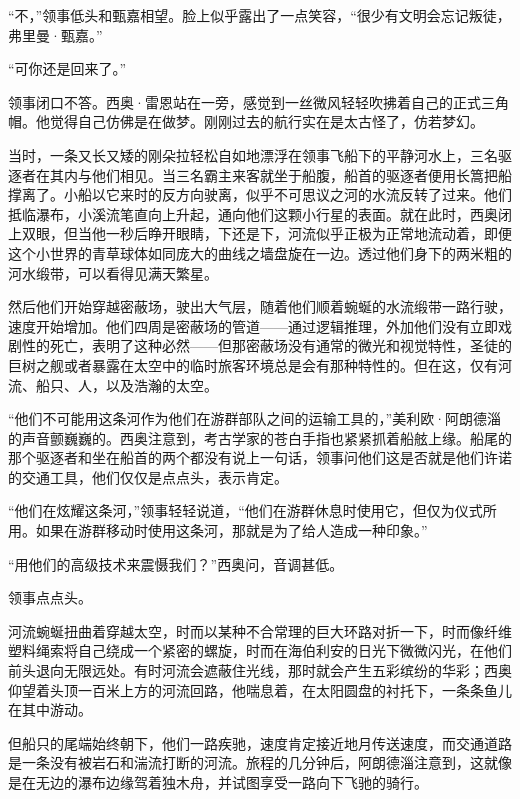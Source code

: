\documentclass[AutoFakeBold=true]{book}
\begin{document}
``不，''领事低头和甄嘉相望。脸上似乎露出了一点笑容，``很少有文明会忘记叛徒，弗里曼·甄嘉。''

``可你还是回来了。''

领事闭口不答。西奥·雷恩站在一旁，感觉到一丝微风轻轻吹拂着自己的正式三角帽。他觉得自己仿佛是在做梦。刚刚过去的航行实在是太古怪了，仿若梦幻。

当时，一条又长又矮的刚朵拉轻松自如地漂浮在领事飞船下的平静河水上，三名驱逐者在其内与他们相见。当三名霸主来客就坐于船腹，船首的驱逐者便用长篙把船撑离了。小船以它来时的反方向驶离，似乎不可思议之河的水流反转了过来。他们抵临瀑布，小溪流笔直向上升起，通向他们这颗小行星的表面。就在此时，西奥闭上双眼，但当他一秒后睁开眼睛，下还是下，河流似乎正极为正常地流动着，即便这个小世界的青草球体如同庞大的曲线之墙盘旋在一边。透过他们身下的两米粗的河水缎带，可以看得见满天繁星。

然后他们开始穿越密蔽场，驶出大气层，随着他们顺着蜿蜒的水流缎带一路行驶，速度开始增加。他们四周是密蔽场的管道——通过逻辑推理，外加他们没有立即戏剧性的死亡，表明了这种必然——但那密蔽场没有通常的微光和视觉特性，圣徒的巨树之舰或者暴露在太空中的临时旅客环境总是会有那种特性的。但在这，仅有河流、船只、人，以及浩瀚的太空。

``他们不可能用这条河作为他们在游群部队之间的运输工具的，''美利欧·阿朗德淄的声音颤巍巍的。西奥注意到，考古学家的苍白手指也紧紧抓着船舷上缘。船尾的那个驱逐者和坐在船首的两个都没有说上一句话，领事问他们这是否就是他们许诺的交通工具，他们仅仅是点点头，表示肯定。

``他们在炫耀这条河，''领事轻轻说道，``他们在游群休息时使用它，但仅为仪式所用。如果在游群移动时使用这条河，那就是为了给人造成一种印象。''

``用他们的高级技术来震慑我们？''西奥问，音调甚低。

领事点点头。

河流蜿蜒扭曲着穿越太空，时而以某种不合常理的巨大环路对折一下，时而像纤维塑料绳索将自己绕成一个紧密的螺旋，时而在海伯利安的日光下微微闪光，在他们前头退向无限远处。有时河流会遮蔽住光线，那时就会产生五彩缤纷的华彩；西奥仰望着头顶一百米上方的河流回路，他喘息着，在太阳圆盘的衬托下，一条条鱼儿在其中游动。

但船只的尾端始终朝下，他们一路疾驰，速度肯定接近地月传送速度，而交通道路是一条没有被岩石和湍流打断的河流。旅程的几分钟后，阿朗德淄注意到，这就像是在无边的瀑布边缘驾着独木舟，并试图享受一路向下飞驰的骑行。
\end{document}
